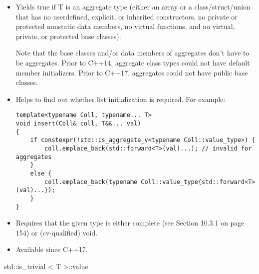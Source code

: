 \begin{itemize}
\item 
Yields true if T is an aggregate type (either an array or a class/struct/union that has no userdefined, explicit, or inherited constructors, no private or protected nonstatic data members, no virtual functions, and no virtual, private, or protected base classes).

\begin{tcolorbox}[colback=webgreen!5!white,colframe=webgreen!75!black]
\hspace*{0.75cm}Note that the base classes and/or data members of aggregates don’t have to be aggregates. Prior to C++14, aggregate class types could not have default member initializers. Prior to C++17, aggregates could not have public base classes.
\end{tcolorbox}

\item 
Helps to find out whether list initialization is required. For example:
\begin{lstlisting}[style=styleCXX]
template<typename Coll, typename... T>
void insert(Coll& coll, T&&... val)
{
	if constexpr(!std::is_aggregate_v<typename Coll::value_type>) {
		coll.emplace_back(std::forward<T>(val)...); // invalid for aggregates
	}
	else {
		coll.emplace_back(typename Coll::value_type{std::forward<T>(val)...});
	}
}
\end{lstlisting}

\item 
Requires that the given type is either complete (see Section 10.3.1 on page 154) or (cv-qualified) void.

\item 
Available since C++17.
\end{itemize}

std::is\_trivial < T >::value

